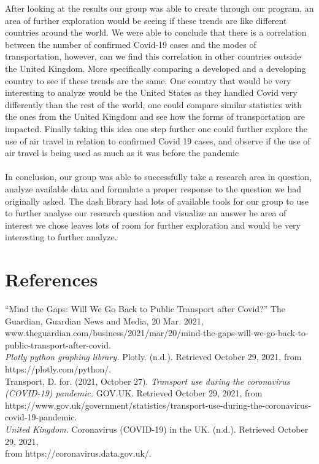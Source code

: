 \documentclass[fontsize=11pt]{article}
\begin{document}
After looking at the results our group was able to create through our program, an area of further exploration would be seeing if these trends are like different countries around the world. We were able to conclude that there is a correlation between the number of confirmed Covid-19 cases and the modes of transportation, however, can we find this correlation in other countries outside the United Kingdom. More specifically comparing a developed and a developing country to see if these trends are the same. One country that would be very interesting to analyze would be the United States as they handled Covid very differently than the rest of the world, one could compare similar statistics with the ones from the United Kingdom and see how the forms of transportation are impacted. Finally taking this idea one step further one could further explore the use of air travel in relation to confirmed Covid 19 cases, and observe if the use of air travel is being used as much as it was before the pandemic \\ \\

In conclusion, our group was able to successfully take a research area in question, analyze available data and formulate a proper response to the question we had originally asked. The dash library had lots of available tools for our group to use to further analyse our research question and visualize an answer he area of interest we chose leaves lots of room for further exploration and would be very interesting to further analyze.


\section*{References}
\begin{hangparas}{.25in}{1}
“Mind the Gaps: Will We Go Back to Public Transport after Covid?” The Guardian, Guardian News and Media, 20 Mar. 2021, www.theguardian.com/business/2021/mar/20/mind-the-gaps-will-we-go-back-to-public-transport-after-covid. \\

\textit{Plotly python graphing library. } Plotly. (n.d.). Retrieved October 29, 2021, from https://plotly.com/python/. \\


Transport, D. for. (2021, October 27). \textit{Transport use during the coronavirus (COVID-19) pandemic.} GOV.UK. Retrieved October 29, 2021, from https://www.gov.uk/government/statistics/transport-use-during-the-coronavirus-covid-19-pandemic. \\


\textit{United Kingdom.} Coronavirus (COVID-19) in the UK. (n.d.). Retrieved October 29, 2021, \\ from https://coronavirus.data.gov.uk/.


\end{hangparas}
\end{document}
